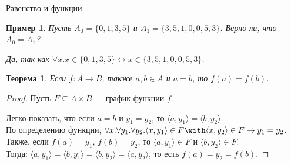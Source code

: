 \documentclass[aspectratio=169]{beamer}
\newtheorem{thm}{Теорема}[section]
\newtheorem{exm}{Пример}[section]
\begin{document}
\begin{frame}{Равенство и функции}
\begin{exm}
Пусть $A_0 = \{0,1,3,5\}$ и $A_1 = \{3,5,1,0,0,5,3\}$.
Верно ли, что $A_0 = A_1$?\pause

Да, так как $\forall x.x \in \{0,1,3,5\} \leftrightarrow x \in \{3,5,1,0,0,5,3\}$.\end{exm}\pause

\begin{thm}
Если $f: A \rightarrow B$, также $a,b\in A$ и $a=b$, то $f(a) = f(b)$.
\end{thm}

\begin{proof}
Пусть $F \subseteq A\times B$ --- график функции $f$.

Легко показать, что если $a=b$ и $y_1 = y_2$, то $\langle a, y_1\rangle = \langle b,y_2\rangle$.\\
По определению функции, $\forall x.\forall y_1.\forall y_2.\langle x,y_1\rangle \in F \with \langle x,y_2 \rangle \in F \rightarrow y_1 = y_2$.\\
Также, если $f(a) = y_1$, $f(b) = y_2$, то $\langle a,y_1 \rangle \in F$ и $\langle b,y_2 \rangle \in F$.\\
Тогда: $\langle a,y_1\rangle = \langle b,y_1\rangle = \langle b,y_2 \rangle = \langle a,y_2\rangle$,
то есть $f(a) = y_2 = f(b)$.

\end{proof}
\end{frame}
\end{document}

